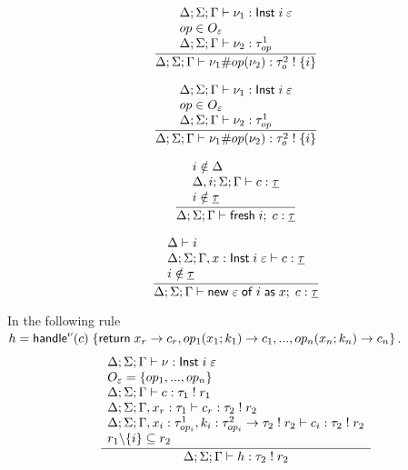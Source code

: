 \[\frac{
	\begin{array}{l}
	\Delta;\Sigma;\Gamma \vdash \nu_1 : \mathsf{Inst} \; i \; \varepsilon \\
	op \in O_\varepsilon \\
	\Delta;\Sigma;\Gamma \vdash \nu_2 : \tau^1_{op}
	\end{array}
}{
	\Delta;\Sigma;\Gamma \vdash \nu_1 \# op(\nu_2) : \tau^2_{o} \; ! \; \{i\}
}\]

\[\frac{
	\begin{array}{l}
	\Delta;\Sigma;\Gamma \vdash \nu_1 : \mathsf{Inst} \; i \; \varepsilon \\
	op \in O_\varepsilon \\
	\Delta;\Sigma;\Gamma \vdash \nu_2 : \tau^1_{op}
	\end{array}
}{
	\Delta;\Sigma;\Gamma \vdash \nu_1 \# op(\nu_2) : \tau^2_{o} \; ! \; \{i\}
}\]

\[\frac{
	\begin{array}{l}
	i \notin \Delta \\
	\Delta,i;\Sigma;\Gamma \vdash c : \underline{\tau} \\
	i \notin \underline{\tau}
	\end{array}
}{
	\Delta;\Sigma;\Gamma \vdash \mathsf{fresh} \; i ;\; c : \underline{\tau}
}\]

\[\frac{
	\begin{array}{l}
	\Delta \vdash i \\
	\Delta;\Sigma;\Gamma,x:\mathsf{Inst} \; i \; \varepsilon \vdash c : \underline{\tau} \\
	i \notin \underline{\tau}
	\end{array}
}{
	\Delta;\Sigma;\Gamma \vdash \mathsf{new} \; \varepsilon \; \mathsf{of} \; i \; \mathsf{as} \; x ;\; c : \underline{\tau}
}\]

In the following rule \\$h = 
	\mathsf{handle}^{\nu} ( c ) \; \{
		\mathsf{return} \; x_r \rightarrow c_r,
		op_1(x_1 ; k_1) \rightarrow c_1,
		...,
		op_n(x_n ; k_n) \rightarrow c_n
	\}$.\\
\[\frac{
	\begin{array}{l}
	\Delta;\Sigma;\Gamma \vdash \nu : \mathsf{Inst} \; i \; \varepsilon \\
	O_\varepsilon = \{ op_1, ..., op_n \} \\
	\Delta;\Sigma;\Gamma \vdash c : \tau_1 \; ! \; r_1 \\
	\Delta;\Sigma;\Gamma, x_r : \tau_1 \vdash c_r : \tau_2 \; ! \; r_2 \\
	\Delta;\Sigma;\Gamma, x_i : \tau^1_{op_i}, k_i : \tau^2_{op_i} \rightarrow \tau_2 \; ! \; r_2 \vdash c_i : \tau_2 \; ! \; r_2 \\
	r_1 \backslash \{ i \} \subseteq r_2 \\
	\end{array}
}{
	\Delta;\Sigma;\Gamma \vdash h : \tau_2 \; ! \; r_2
}\]

